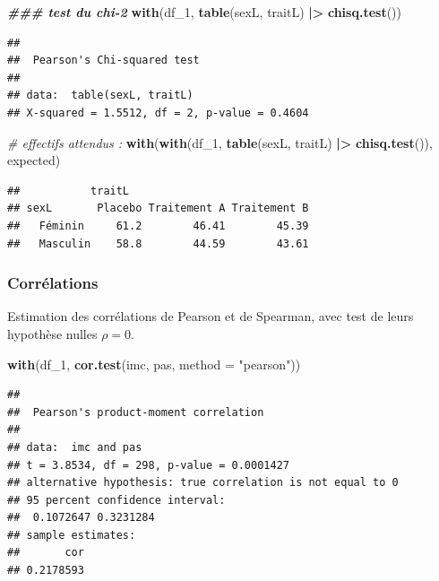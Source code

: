 \documentclass[
]{book}
\newenvironment{Shaded}{\begin{snugshade}}{\end{snugshade}}
\newcommand{\AttributeTok}[1]{\textcolor[rgb]{0.13,0.29,0.53}{#1}}
\newcommand{\CommentTok}[1]{\textcolor[rgb]{0.56,0.35,0.01}{\textit{#1}}}
\newcommand{\DocumentationTok}[1]{\textcolor[rgb]{0.56,0.35,0.01}{\textbf{\textit{#1}}}}
\newcommand{\FunctionTok}[1]{\textcolor[rgb]{0.13,0.29,0.53}{\textbf{#1}}}
\newcommand{\NormalTok}[1]{#1}
\newcommand{\SpecialCharTok}[1]{\textcolor[rgb]{0.81,0.36,0.00}{\textbf{#1}}}
\newcommand{\StringTok}[1]{\textcolor[rgb]{0.31,0.60,0.02}{#1}}
\begin{document}
\begin{Shaded}
\begin{Highlighting}[]
\DocumentationTok{\#\#\# test du chi{-}2}
\FunctionTok{with}\NormalTok{(df\_1, }
     \FunctionTok{table}\NormalTok{(sexL, traitL) }\SpecialCharTok{|\textgreater{}}
       \FunctionTok{chisq.test}\NormalTok{())}
\end{Highlighting}
\end{Shaded}

\begin{verbatim}
## 
##  Pearson's Chi-squared test
## 
## data:  table(sexL, traitL)
## X-squared = 1.5512, df = 2, p-value = 0.4604
\end{verbatim}

\begin{Shaded}
\begin{Highlighting}[]
\CommentTok{\# effectifs attendus :}
\FunctionTok{with}\NormalTok{(}\FunctionTok{with}\NormalTok{(df\_1, }
          \FunctionTok{table}\NormalTok{(sexL, traitL) }\SpecialCharTok{|\textgreater{}}
            \FunctionTok{chisq.test}\NormalTok{()),}
\NormalTok{     expected)}
\end{Highlighting}
\end{Shaded}

\begin{verbatim}
##           traitL
## sexL       Placebo Traitement A Traitement B
##   Féminin     61.2        46.41        45.39
##   Masculin    58.8        44.59        43.61
\end{verbatim}

\subsubsection{Corrélations}\label{corruxe9lations-1}

Estimation des corrélations de Pearson et de Spearman, avec test de leurs hypothèse nulles \(\rho = 0\).

\begin{Shaded}
\begin{Highlighting}[]
\FunctionTok{with}\NormalTok{(df\_1,}
     \FunctionTok{cor.test}\NormalTok{(imc, pas, }\AttributeTok{method =} \StringTok{"pearson"}\NormalTok{))}
\end{Highlighting}
\end{Shaded}

\begin{verbatim}
## 
##  Pearson's product-moment correlation
## 
## data:  imc and pas
## t = 3.8534, df = 298, p-value = 0.0001427
## alternative hypothesis: true correlation is not equal to 0
## 95 percent confidence interval:
##  0.1072647 0.3231284
## sample estimates:
##       cor 
## 0.2178593
\end{verbatim}
\end{document}
